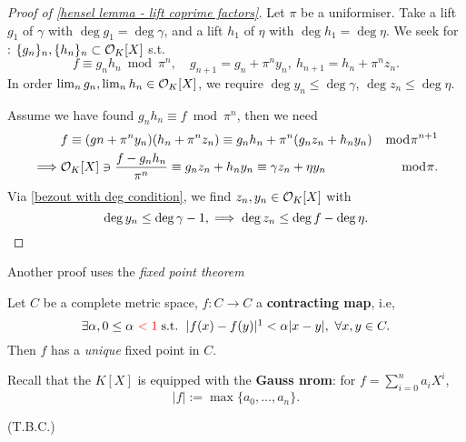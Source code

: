 \begin{proof}[Proof of \cref{hensel lemma - lift coprime factors}]
    Let $\pi$ be a uniformiser.
    Take a lift $g_1$ of $\gamma$ with $\deg g_1 = \deg \gamma$, and a lift $h_1$ of $\eta$ with $\deg h_1 = \deg\eta$.
    We seek for : $\{g_n\}_n, \{h_n\}_n\subset\mathcal{O}_K[X]$ s.t. \[f \equiv g_nh_n\bmod \pi^n,\quad g_{n + 1} = g_n + \pi^ny_n,\ h_{n+1} = h_n + \pi^nz_n .\]
    In order $\lim_n g_n, \lim_n h_n\in\mathcal{O}_K[X]$,
    we require $\deg y_n \le \deg \gamma$, $\deg z_n\le \deg \eta$.

    Assume we have found $g_nh_n\equiv f\bmod \pi^n$,
    then we need\begin{align*}
        &{} f\equiv (gn+\pi^ny_n)(h_n + \pi^nz_n)\equiv g_nh_n + \pi^n(g_nz_n + h_ny_n) &\bmod \pi^{n+1}\\
        \implies & \mathcal{O}_K[X]\ni \frac{f - g_nh_n}{\pi^n}\equiv g_nz_n+h_ny_n \equiv \gamma z_n + \eta y_n&\bmod\pi.
    \end{align*}
    Via \cref{bezout with deg condition},
    we find $z_n, y_n\in\mathcal{O}_K[X]$ with \[\deg y_n\le\deg\gamma -1,\implies\deg z_n \le \deg f - \deg\eta.\qedhere\]
\end{proof}


Another proof uses the \textit{fixed point theorem}
\begin{lemma}
    Let $C$ be a complete metric space, $f : C\to C$ a \textbf{contracting map}, i.e, \[\exists\alpha, 0\le \alpha\ {\color{red}< 1} \st\ |f(x) - f(y)|\footnotemark <\alpha |x-y|,\ \forall x, y\in C. \]
    Then $f$ has a \textit{unique} fixed point in $C$.
\end{lemma}

Recall that the $K[X]$ is equipped with the \textbf{Gauss nrom}: for $f = \sum_{i=0}^n a_iX^i$,
\[|f| := \max\{a_0, \dots, a_n\}.\]

(T.B.C.)
    

    

